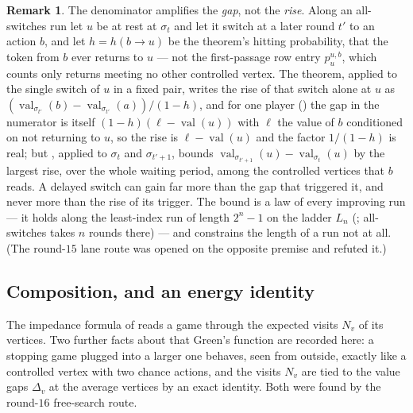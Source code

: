 \documentclass[11pt]{article}
\theoremstyle{plain}
\theoremstyle{definition}
\newtheorem{remark}[theorem]{Remark}
\DeclareMathOperator{\val}{val}
\begin{document}
\begin{remark}
The denominator amplifies the \emph{gap}, not the \emph{rise}. Along an
all-switches run let $u$ be at rest at $\sigma_t$ and let it switch at a
later round $t'$ to an action $b$, and let $h=h(b\to u)$ be the
theorem's hitting probability, that the token from $b$ ever returns to
$u$ --- not the first-passage row entry $p^{u,b}_u$, which counts only
returns meeting no other controlled vertex. The theorem, applied to the
single switch of $u$ in a fixed pair, writes the rise of that switch alone at $u$ as
$(\val_{\sigma_{t'}}(b)-\val_{\sigma_{t'}}(a))/(1-h)$, and for one player
() the gap in the
numerator is itself $(1-h)(\ell-\val(u))$ with $\ell$ the value of $b$
conditioned on not returning to $u$, so the rise is $\ell-\val(u)$ and
the factor $1/(1-h)$ is real; but , applied to
$\sigma_t$ and $\sigma_{t'+1}$, bounds $\val_{\sigma_{t'+1}}(u)-\val_{\sigma_t}(u)$
by the largest rise, over the whole waiting period, among the controlled
vertices that $b$ reads. A delayed switch can gain far more than the gap
that triggered it, and never more than the rise of its trigger. The
bound is a law of every improving run --- it holds along the least-index
run of length $2^{n}-1$ on the ladder $L_n$ (; all-switches
takes $n$ rounds there) --- and
constrains the length of a run not at all. (The round-$15$ lane route
was opened on the opposite premise and refuted it.)
\end{remark}

\subsection{Composition, and an energy identity}\label{sec:composition}

The impedance formula of  reads a game through the
expected visits $N_v$ of its vertices. Two further facts about that
Green's function are recorded here: a stopping game plugged into a larger
one behaves, seen from outside, exactly like a controlled vertex with two
chance actions, and the visits $N_v$ are tied to the value gaps
$\Delta_v$ at the average vertices by an exact identity. Both were found
by the round-$16$ free-search route.
\end{document}
